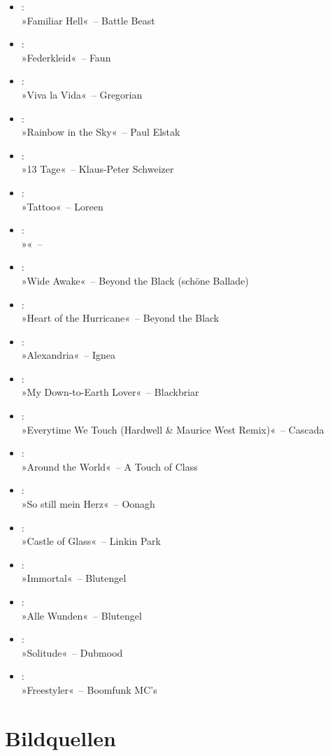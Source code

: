 \begin{itemize}
    \item :\\ »Familiar Hell«~– Battle Beast
    \item :\\ »Federkleid«~– Faun
    \item :\\ »Viva la Vida«~– Gregorian
    \item :\\ »Rainbow in the Sky«~– Paul Elstak
    \item :\\ »13 Tage«~– Klaus-Peter Schweizer
    \item :\\ »Tattoo«~– Loreen
    \item :\\ »«~–
    \item :\\ »Wide Awake«~– Beyond the Black (schöne Ballade)
    \item :\\ »Heart of the Hurricane«~– Beyond the Black
    \item :\\ »Alexandria«~– Ignea
    \item :\\ »My Down-to-Earth Lover«~– Blackbriar
    \item :\\ »Everytime We Touch (Hardwell & Maurice West Remix)«~– Cascada
    \item :\\ »Around the World«~– A Touch of Class
    \item :\\ »So still mein Herz«~– Oonagh
    \item :\\ »Castle of Glass«~– Linkin Park
    \item :\\ »Immortal«~– Blutengel
    \item :\\ »Alle Wunden«~– Blutengel
    \item :\\ »Solitude«~– Dubmood
    \item :\\ »Freestyler«~– Boomfunk MC’s
\end{itemize}


\chapter{Bildquellen}

